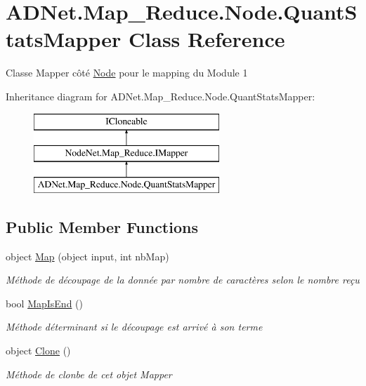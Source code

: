 \hypertarget{class_a_d_net_1_1_map___reduce_1_1_node_1_1_quant_stats_mapper}{}\section{A\+D\+Net.\+Map\+\_\+\+Reduce.\+Node.\+Quant\+Stats\+Mapper Class Reference}
\label{class_a_d_net_1_1_map___reduce_1_1_node_1_1_quant_stats_mapper}


Classe Mapper côté \hyperlink{namespace_a_d_net_1_1_map___reduce_1_1_node}{Node} pour le mapping du Module 1  


Inheritance diagram for A\+D\+Net.\+Map\+\_\+\+Reduce.\+Node.\+Quant\+Stats\+Mapper\+:\begin{figure}[H]
\begin{center}
\leavevmode
\includegraphics[height=3.000000cm]{class_a_d_net_1_1_map___reduce_1_1_node_1_1_quant_stats_mapper}
\end{center}
\end{figure}
\subsection*{Public Member Functions}
\begin{DoxyCompactItemize}
\item 
object \hyperlink{class_a_d_net_1_1_map___reduce_1_1_node_1_1_quant_stats_mapper_a79e61ac8815e19005f446efd5abec94c}{Map} (object input, int nb\+Map)
\begin{DoxyCompactList}\small\item\em Méthode de découpage de la donnée par nombre de caractères selon le nombre reçu \end{DoxyCompactList}\item 
bool \hyperlink{class_a_d_net_1_1_map___reduce_1_1_node_1_1_quant_stats_mapper_aca541c507e21824ff679f62be55aeab4}{Map\+Is\+End} ()
\begin{DoxyCompactList}\small\item\em Méthode déterminant si le découpage est arrivé à son terme \end{DoxyCompactList}\item 
object \hyperlink{class_a_d_net_1_1_map___reduce_1_1_node_1_1_quant_stats_mapper_a8b49d45b5c0d2446323549f6716f5b45}{Clone} ()
\begin{DoxyCompactList}\small\item\em Méthode de clonbe de cet objet Mapper \end{DoxyCompactList}\end{DoxyCompactItemize}


